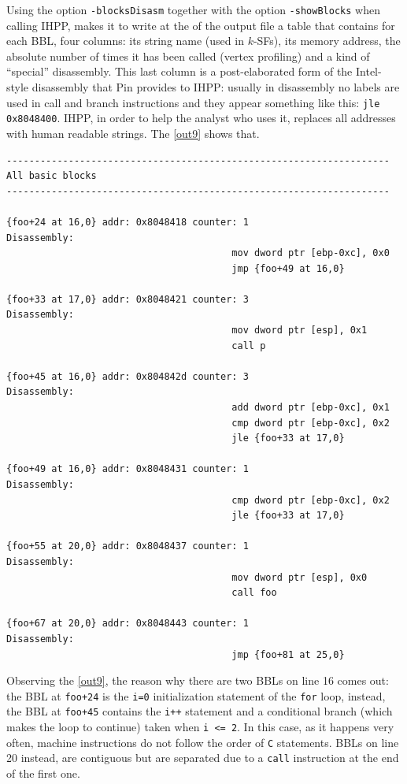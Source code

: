 \documentclass[a4paper,11pt]{report}
\begin{document}
Using the option \verb|-blocksDisasm| together with the option \verb|-showBlocks| 
when calling IHPP, makes it to write at the of the output file a table 
that contains for each BBL, four columns: its string name (used in $k$-SFs), its memory address, the absolute number of times it has been called (vertex profiling) and
a kind of ``special'' disassembly. This last column is a post-elaborated form 
of the Intel-style disassembly that Pin provides to IHPP: usually in disassembly 
no labels are used in call and branch instructions and they appear something like this: 
\verb|jle 0x8048400|. IHPP, in order to help the analyst who uses it, replaces 
all addresses with human readable strings. The \cref{out9} shows that.

\begin{lstlisting}[language={[x86masm]Assembler}, 
	label=out9, caption={a part of ``all basic blocks'' table}, frame=bottomline]
--------------------------------------------------------------------
All basic blocks
--------------------------------------------------------------------

{foo+24 at 16,0} addr: 0x8048418 counter: 1	
Disassembly: 
										mov dword ptr [ebp-0xc], 0x0
										jmp {foo+49 at 16,0}

{foo+33 at 17,0} addr: 0x8048421 counter: 3	
Disassembly: 
										mov dword ptr [esp], 0x1
										call p

{foo+45 at 16,0} addr: 0x804842d counter: 3	
Disassembly: 
										add dword ptr [ebp-0xc], 0x1
										cmp dword ptr [ebp-0xc], 0x2
										jle {foo+33 at 17,0}

{foo+49 at 16,0} addr: 0x8048431 counter: 1	
Disassembly: 
										cmp dword ptr [ebp-0xc], 0x2
										jle {foo+33 at 17,0}

{foo+55 at 20,0} addr: 0x8048437 counter: 1	
Disassembly: 
										mov dword ptr [esp], 0x0
										call foo

{foo+67 at 20,0} addr: 0x8048443 counter: 1	
Disassembly: 
										jmp {foo+81 at 25,0}

\end{lstlisting}

Observing the \cref{out9}, the reason why there are two BBLs on line 16 comes out:
the BBL at \verb|foo+24| is the \verb|i=0| initialization statement 
of the \verb|for| loop, instead, the BBL at \verb|foo+45| contains the \verb|i++| statement and a conditional branch (which makes the loop to continue) taken when
\verb|i <= 2|. In this case, as it happens very often, machine instructions 
do not follow the order of \verb|C| statements. BBLs on line 20 instead, are contiguous
but are separated due to a \verb|call| instruction at the end of the first one.
\end{document}
